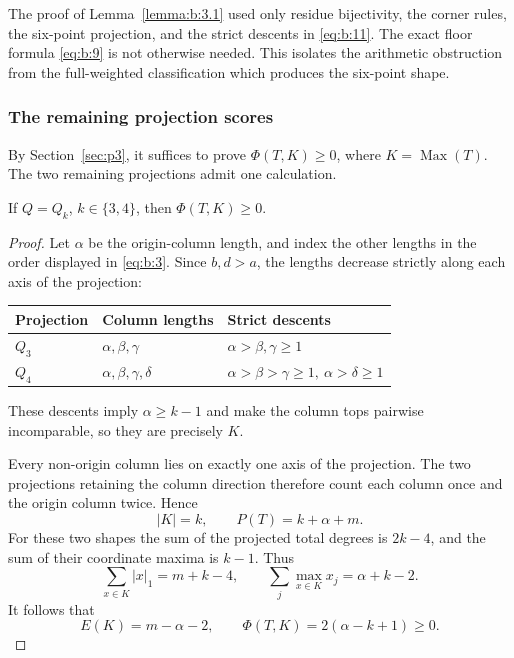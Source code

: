 \begin{remark}\label{remark:b:3.2}

The proof of Lemma~\ref{lemma:b:3.1} used only residue bijectivity, the corner rules, the
six-point projection, and the strict descents in \eqref{eq:b:11}. The exact floor
formula \eqref{eq:b:9} is not otherwise needed. This isolates the arithmetic obstruction
from the full-weighted classification which produces the six-point shape.

\end{remark}
\subsubsection{The remaining projection scores}

By Section~\ref{sec:p3}, it suffices to prove \(\Phi(T,K)\ge0\), where
\(K=\operatorname{Max}(T)\). The two remaining projections admit one
calculation.

\begin{lemma}\label{lemma:b:4.1}
If \(Q=Q_k\), \(k\in\{3,4\}\), then \(\Phi(T,K)\ge0\).
\end{lemma}
\begin{proof}
Let \(\alpha\) be the origin-column length, and index the other lengths
in the order displayed in \eqref{eq:b:3}. Since \(b,d>a\), the lengths
decrease strictly along each axis of the projection:
\begin{center}
\begin{tabularx}{\textwidth}{@{}lYY@{}}
\toprule
Projection & Column lengths & Strict descents \\
\midrule
\(Q_3\) & \(\alpha,\beta,\gamma\) & \(\alpha>\beta,\gamma\ge1\) \\
\(Q_4\) & \(\alpha,\beta,\gamma,\delta\) &
\(\alpha>\beta>\gamma\ge1,\ \alpha>\delta\ge1\) \\
\bottomrule
\end{tabularx}
\end{center}
These descents imply \(\alpha\ge k-1\) and make the column tops pairwise
incomparable, so they are precisely \(K\).

Every non-origin column lies on exactly one axis of the projection. The
two projections retaining the column direction therefore count each
column once and the origin column twice. Hence
\begin{equation}
|K|=k,\qquad P(T)=k+\alpha+m.
\label{eq:b:20}
\end{equation}
For these two shapes the sum of the projected total degrees is
\(2k-4\), and the sum of their coordinate maxima is \(k-1\). Thus
\[
\sum_{x\in K}|x|_1=m+k-4,\qquad
\sum_j\max_{x\in K}x_j=\alpha+k-2.
\]
It follows that
\begin{equation}
E(K)=m-\alpha-2,\qquad
\Phi(T,K)=2(\alpha-k+1)\ge0.
\label{eq:b:21}
\end{equation}
\end{proof}

